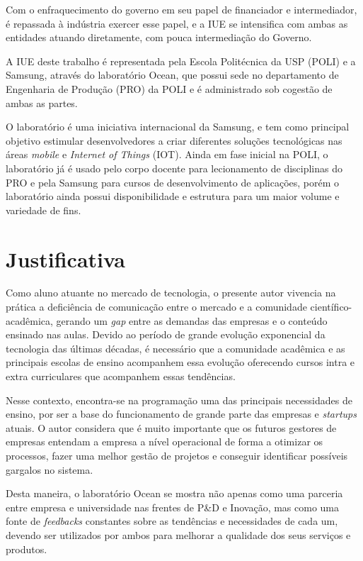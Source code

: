 Com o enfraquecimento do governo em seu papel de financiador e intermediador, é repassada à indústria exercer esse papel, e a IUE se intensifica com ambas as entidades atuando diretamente, com pouca intermediação do Governo.

A IUE deste trabalho é representada pela Escola Politécnica da USP (POLI) e a Samsung, através do laboratório Ocean, que possui sede no departamento de Engenharia de Produção (PRO) da POLI e é administrado sob cogestão de ambas as partes.

O laboratório é uma iniciativa internacional da Samsung, e tem como principal objetivo estimular desenvolvedores a criar diferentes soluções tecnológicas nas áreas \textit{mobile} e \textit{Internet of Things} (IOT). Ainda em fase inicial na POLI, o laboratório já é usado pelo corpo docente para lecionamento de disciplinas do PRO e pela Samsung para cursos de desenvolvimento de aplicações, porém o laboratório ainda possui disponibilidade e estrutura para um maior volume e variedade de fins.

\section{Justificativa}
\label{cha:justificativa}

Como aluno atuante no mercado de tecnologia, o presente autor vivencia na prática a deficiência de comunicação entre o mercado e a comunidade científico-acadêmica, gerando um \textit{gap} entre as demandas das empresas e o conteúdo ensinado nas aulas. Devido ao período de grande evolução exponencial da tecnologia das últimas décadas, é necessário que a comunidade acadêmica e as principais escolas de ensino acompanhem essa evolução oferecendo cursos intra e extra curriculares que acompanhem essas tendências.

Nesse contexto, encontra-se na programação uma das principais necessidades de ensino, por ser a base do funcionamento de grande parte das empresas e \textit{startups} atuais. O autor considera que é muito importante que os futuros gestores de empresas entendam a empresa a nível operacional de forma a otimizar os processos, fazer uma melhor gestão de projetos e conseguir identificar possíveis gargalos no sistema.

Desta maneira, o laboratório Ocean se mostra não apenas como uma parceria entre empresa e universidade nas frentes de  P\&D e Inovação, mas como uma fonte de \textit{feedbacks} constantes sobre as tendências e necessidades de cada um, devendo ser utilizados por ambos para melhorar a qualidade dos seus serviços e produtos.

